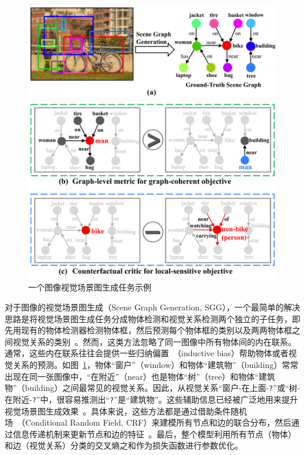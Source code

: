 \begin{figure}[htbp]
    \centering
    \includegraphics[width=0.95\linewidth]{chapter4/res/sgg.pdf}
    \caption{一个图像视觉场景图生成任务示例}
    \label{ch4:fig:sgg}
\end{figure}


对于图像的视觉场景图生成（Scene Graph Generation, SGG），一个最简单的解决思路是将视觉场景图生成任务分成物体检测和视觉关系检测两个独立的子任务，即先用现有的物体检测器检测物体框，然后预测每个物体框的类别以及两两物体框之间视觉关系的类别~\cite{lu2016visual,zhang2017visual,yang2018shuffle}。然而，这类方法忽略了同一图像中所有物体间的内在联系。通常，这些内在联系往往会提供一些归纳偏置~\cite{divvala2009empirical}（inductive bias）帮助物体或者视觉关系的预测。如图~\ref{ch4:fig:sgg}，物体“窗户”（window）和物体“建筑物”（building）常常出现在同一张图像中，“在附近”（near）也是物体“树”（tree）和物体“建筑物”（building）之间最常见的视觉关系。因此，从视觉关系“窗户-在上面-\texttt{?}”或“树-在附近-\texttt{?}”中，很容易推测出“\texttt{?}”是“建筑物”。这些辅助信息已经被广泛地用来提升视觉场景图生成效果~\cite{xu2017scene, dai2017detecting, li2017vip, li2017scene, li2018factorizable, yin2018zoom, jae2018tensorize, zellers2018neural, tang2019learning, gu2019scene, qi2019attentive, wang2019exploring, qian2019video}。具体来说，这些方法都是通过借助条件随机场~\cite{zheng2015conditional}（Conditional Random Field, CRF）来建模所有节点和边的联合分布，然后通过信息传递机制来更新节点和边的特征~\cite{krahenbuhl2011efficient}。最后，整个模型利用所有节点（物体）和边（视觉关系）分类的交叉熵之和作为损失函数进行参数优化。


